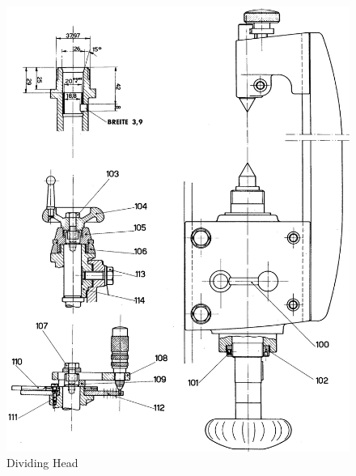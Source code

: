\newpage
\begin{figure}[h]
    \centering
    \includegraphics[width=1.0\linewidth]{images/page_45}
    \caption{Dividing Head}
    \label{fig:dividing_head}
\end{figure}
